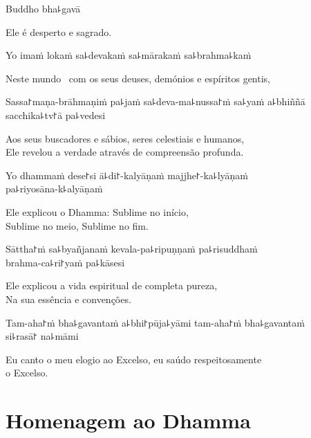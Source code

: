 Buddho bha꜕gavā

\begin{english}
  Ele é desperto e sagrado.
\end{english}

Yo imaṁ lokaṁ sa꜕devakaṁ sa꜕mārakaṁ sa꜕brahma꜕kaṁ

\begin{english}
  Neste mundo \pause\ com os seus deuses, demónios e espíritos gentis,
\end{english}

Sassa꜓maṇa-brāhmaṇiṁ pa꜕jaṁ sa꜕deva-ma꜕nussa꜓ṁ sa꜕yaṁ a꜕bhiññā sacchika꜕tv꜓ā pa꜕vedesi

\begin{english}
  Aos seus buscadores e sábios, seres celestiais e humanos,\\ Ele revelou a verdade através de compreensão profunda.
\end{english}

Yo dhammaṁ dese꜓si ā꜕di꜓-kalyāṇaṁ majjhe꜓-ka꜕lyāṇaṁ \\pa꜕riyosāna-k꜕alyāṇaṁ

\begin{english}
  Ele explicou o Dhamma: Sublime no início,\\ Sublime no meio, Sublime no fim.
\end{english}

Sāttha꜓ṁ sa꜕byañjanaṁ kevala-pa꜕ripuṇṇaṁ pa꜕risuddhaṁ \\brahma-ca꜕ri꜓yaṁ pa꜕kāsesi

\begin{english}
  Ele explicou a vida espiritual de completa pureza,\\Na sua essência e convenções.
\end{english}

Tam-aha꜓ṁ bha꜕gavantaṁ a꜕bhi꜓pūja꜕yāmi tam-aha꜓ṁ bha꜕gavantaṁ \\si꜕rasā꜓ na꜕māmi

\begin{english}
  Eu canto o meu elogio ao Excelso, eu saúdo respeitosamente \\o Excelso.
\end{english}

\clearpage

\chapter{Homenagem ao Dhamma}

\begin{leader}
\end{leader}

